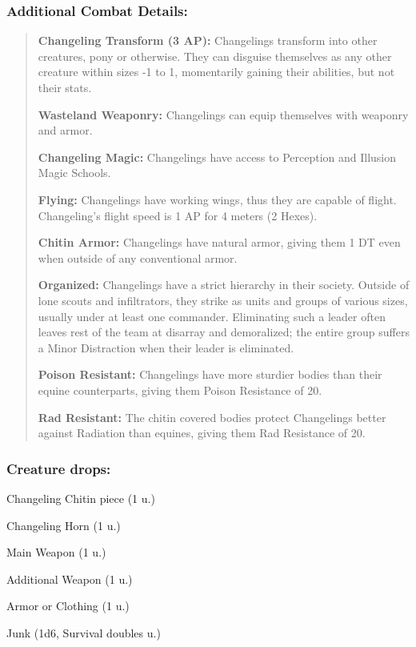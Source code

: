 \documentclass[11pt,a4paper,twocolumn]{book}
\begin{document}
	\subsubsection*{Additional Combat Details:}
	\begin{verse}
		\textbf{Changeling Transform (3 AP):} Changelings transform into other creatures, pony or otherwise. They can disguise themselves as any other creature within sizes -1 to 1, momentarily gaining their abilities, but not their stats.
		
		\textbf{Wasteland Weaponry:} Changelings can equip themselves with weaponry and armor.
		
		\textbf{Changeling Magic:} Changelings have access to Perception and Illusion Magic Schools.
		
		\textbf{Flying:} Changelings have working wings, thus they are capable of flight. Changeling's flight speed is 1 AP for 4 meters (2 Hexes). 
		
		\textbf{Chitin Armor:} Changelings have natural armor, giving them 1 DT even when outside of any conventional armor.
		
		\textbf{Organized:} Changelings have a strict hierarchy in their society. Outside of lone scouts and infiltrators, they strike as units and groups of various sizes, usually under at least one commander. Eliminating such a leader often leaves rest of the team at disarray and demoralized; the entire group suffers a Minor Distraction when their leader is eliminated.
		
		\textbf{Poison Resistant:} Changelings have more sturdier bodies than their equine counterparts, giving them Poison Resistance of 20.
		
		\textbf{Rad Resistant:} The chitin covered bodies protect Changelings better against Radiation than equines, giving them Rad Resistance of 20.
	\end{verse}
	
	\vfill
	\subsubsection*{Creature drops:}
	\begin{compactitem}
		\item Changeling Chitin piece (1 u.)
		\item Changeling Horn (1 u.)
		\item Main Weapon (1 u.)
		\item Additional Weapon (1 u.)
		\item Armor or Clothing (1 u.)
		\item Junk (1d6, Survival doubles u.)
	\end{compactitem}
	
\end{document}
